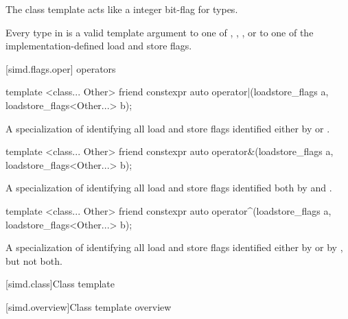 \pnum
The class template  acts like a integer bit-flag for types.

\pnum\constraints
Every type in  is a valid template argument to one of
, ,
, or to one of the implementation-defined load and
store flags.

[simd.flags.oper]{ operators}

\begin{itemdecl}
template <class... Other>
  friend constexpr auto operator|(loadstore_flags a, loadstore_flags<Other...> b);
\end{itemdecl}

\begin{itemdescr}
  \pnum\returns
  A specialization of  identifying all load and
  store flags identified either by  or .
\end{itemdescr}

\begin{itemdecl}
template <class... Other>
  friend constexpr auto operator&(loadstore_flags a, loadstore_flags<Other...> b);
\end{itemdecl}

\begin{itemdescr}
  \pnum\returns
  A specialization of  identifying all load and
  store flags identified both by  and .
\end{itemdescr}

\begin{itemdecl}
template <class... Other>
  friend constexpr auto operator^(loadstore_flags a, loadstore_flags<Other...> b);
\end{itemdecl}

\begin{itemdescr}
  \pnum\returns
  A specialization of  identifying all load and
  store flags identified either by  or by , but not both.
\end{itemdescr}

[simd.class]{Class template }

[simd.overview]{Class template  overview}

